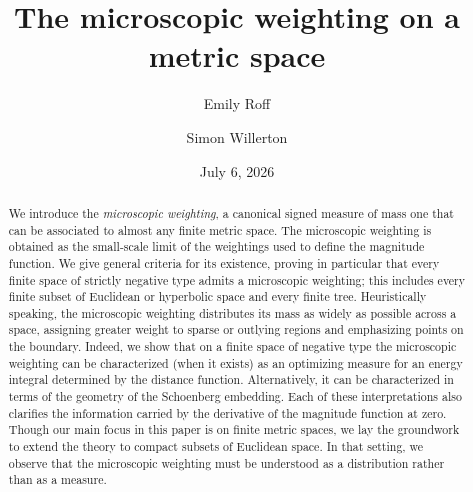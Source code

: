 \documentclass[a4paper, oneside, reqno]{amsart}
\theoremstyle{definition}
\theoremstyle{remark}
\numberwithin{equation}{section}
\begin{document}
\title{The microscopic weighting on a metric space}

\author{Emily Roff}
\address{ER: School of Mathematics and the Maxwell Institute for Mathematical Sciences, University of Edinburgh, Scotland}

\author{Simon Willerton}
\address{SW: School of Mathematical and Physical Sciences, University of Sheffield, England}


\date{July 6, 2026}

\begin{abstract}
We introduce the \emph{microscopic weighting}, a canonical signed measure of mass one that can be associated to almost any finite metric space. The microscopic weighting is obtained as the small-scale limit of the weightings used to define the magnitude function. We give general criteria for its existence, proving in particular that every finite space of strictly negative type admits a microscopic weighting; this includes every finite subset of Euclidean or hyperbolic space and every finite tree. Heuristically speaking, the microscopic weighting distributes its mass as widely as possible across a space, assigning greater weight to sparse or outlying regions and emphasizing points on the boundary. Indeed, we show that on a finite space of negative type the microscopic weighting can be characterized (when it exists) as an optimizing measure for an energy integral determined by the distance function. Alternatively, it can be characterized in terms of the geometry of the Schoenberg embedding. Each of these interpretations also clarifies the information carried by the derivative of the magnitude function at zero. Though our main focus in this paper is on finite metric spaces, we lay the groundwork to extend the theory to compact subsets of Euclidean space. In that setting, we observe that the microscopic weighting must be understood as a distribution rather than as a measure.
\end{abstract}

\maketitle

\setcounter{tocdepth}{1}
\tableofcontents

\end{document}
